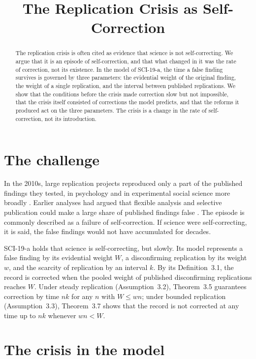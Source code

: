 \documentclass{situationist-preprint}
\title{The Replication Crisis as Self-Correction}
\begin{document}
\maketitle

\begin{abstract}
The replication crisis is often cited as evidence that science is not self-correcting. We argue that it is an episode of self-correction, and that what changed in it was the rate of correction, not its existence. In the model of SCI-19-a, the time a false finding survives is governed by three parameters: the evidential weight of the original finding, the weight of a single replication, and the interval between published replications. We show that the conditions before the crisis made correction slow but not impossible, that the crisis itself consisted of corrections the model predicts, and that the reforms it produced act on the three parameters. The crisis is a change in the rate of self-correction, not its introduction.
\end{abstract}

\section{The challenge}

In the 2010s, large replication projects reproduced only a part of the published findings they tested, in psychology \citep{OSC2015} and in experimental social science more broadly \citep{Camerer2018}. Earlier analyses had argued that flexible analysis and selective publication could make a large share of published findings false \citep{Ioannidis2005,Simmons2011}. The episode is commonly described as a failure of self-correction. If science were self-correcting, it is said, the false findings would not have accumulated for decades.

SCI-19-a holds that science is self-correcting, but slowly. Its model represents a false finding by its evidential weight $W$, a disconfirming replication by its weight $w$, and the scarcity of replication by an interval $k$. By its Definition~3.1, the record is corrected when the pooled weight of published disconfirming replications reaches $W$. Under steady replication (Assumption~3.2), Theorem~3.5 guarantees correction by time $nk$ for any $n$ with $W\le wn$; under bounded replication (Assumption~3.3), Theorem~3.7 shows that the record is not corrected at any time up to $nk$ whenever $wn<W$.

\section{The crisis in the model}
\end{document}
